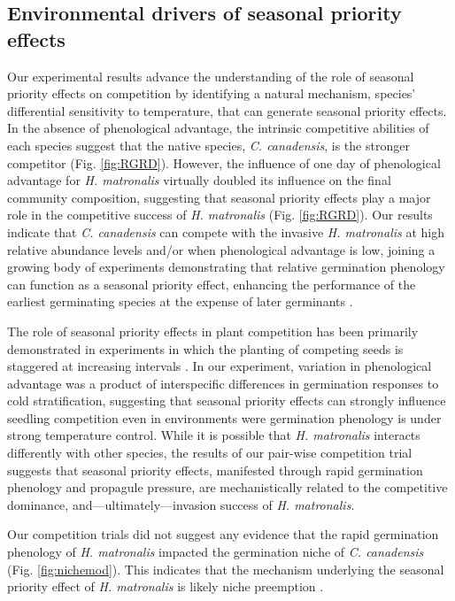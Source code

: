 \documentclass{article}[11pt]
\begin{document}
\subsection*{Environmental drivers of seasonal priority effects}
Our experimental results advance the understanding of the role of seasonal priority effects on competition by identifying a natural mechanism, species' differential sensitivity to temperature, that can generate seasonal priority effects. In the absence of phenological advantage, the intrinsic competitive abilities of each species suggest that the native species, \textit{C. canadensis}, is the stronger competitor (Fig. \ref{fig:RGRD}). %
However, the influence of one day of phenological advantage for \textit{H. matronalis} virtually doubled its influence on the final community composition, suggesting that seasonal priority effects play a major role in the competitive success of \textit{H. matronalis} (Fig. \ref{fig:RGRD}). Our results indicate that \textit{C. canadensis} can compete with the invasive \textit{H. matronalis} at high relative abundance levels and/or when phenological advantage is low, joining a growing body of experiments demonstrating that relative germination phenology can function as a seasonal priority effect, enhancing the performance of the earliest germinating species at the expense of later germinants \citep{Korner2008,Dickson2012,Ross1972}.

The role of seasonal priority effects in plant competition has been primarily demonstrated in experiments in which the planting of competing seeds is staggered at increasing intervals \citep{Young:2017aa,Weidlich:2020aa}. In our experiment, variation in phenological advantage was a product of interspecific differences in germination responses to cold stratification, suggesting that seasonal priority effects can strongly influence seedling competition even in environments were germination phenology is under strong temperature control. While it is possible that \textit{H. matronalis} interacts differently with other species, the results of our pair-wise competition trial suggests that seasonal priority effects, manifested through rapid germination phenology and propagule pressure, are mechanistically related to the competitive dominance, and---ultimately---invasion success of \textit{H. matronalis}. 

Our competition trials did not suggest any evidence that the rapid germination phenology of \textit{H. matronalis} impacted the germination niche of \textit{C. canadensis} (Fig. \ref{fig:nichemod}). This indicates that the mechanism underlying the seasonal priority effect of \textit{H. matronalis} is likely niche preemption \citep{Gioria2018}.%
\end{document}

